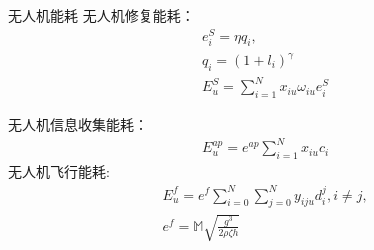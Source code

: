 \documentclass{ctexbeamer}
\begin{document}
\begin{frame}{无人机能耗}
    \small
    无人机修复能耗：
    \begin{align}
        & e_i^S = \eta q_i, \\
        & q_i=(1+l_i)^\gamma \\
        & E^{S}_u=\sum \limits_{i=1}^Nx_{iu}\omega_{iu}e_i^S
    \end{align}
    
    无人机信息收集能耗：
    \begin{align}
    & E_u^{ap}=e^{ap}\sum \limits_{i=1}^Nx_{iu}c_i
    \end{align}
    无人机飞行能耗:
    \begin{align}
& E_u^f=e^f\sum \limits_{i=0}^N\sum \limits_{j=0}^Ny_{iju}d_i^j,i\neq j,\\
& e^f=\mathbb{M}\sqrt{\frac{g^3}{2\rho\zeta h}}
\end{align}

\end{frame}
\end{document}
